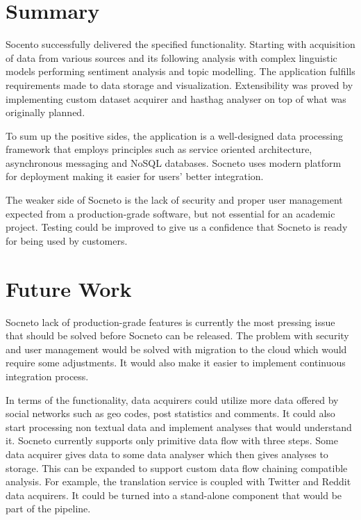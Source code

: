 \section{Summary}

Socento successfully delivered the specified functionality. Starting with acquisition of data from various sources and its following analysis with complex linguistic models performing sentiment analysis and topic modelling. The application fulfills requirements made to data storage and visualization. Extensibility was proved by implementing custom dataset acquirer and hasthag analyser on top of what was originally planned. 

To sum up the positive sides, the application is a well-designed data processing framework that  employs principles such as service oriented architecture, asynchronous messaging and NoSQL databases. Socneto uses modern platform for deployment making it easier for users' better integration. 

The weaker side of Socneto is the lack of security and proper user management expected from a production-grade software, but not essential for an academic project. Testing could be improved to give us a confidence that Socneto is ready for being used by customers.

\section{Future Work}

Socneto lack of production-grade features is currently the most pressing issue that should be solved before Socneto can be released. The problem with security and user management would be solved with migration to the cloud which would require some adjustments. It would also make it easier to implement continuous integration process.

In terms of the functionality, data acquirers could utilize more data offered by social networks such as geo codes, post statistics and comments. It could also start processing non textual data and implement analyses that would understand it. Socneto currently supports only primitive data flow with three steps. Some data acquirer gives data to some data analyser which then gives analyses to storage. This can be expanded to support custom data flow chaining compatible analysis. For example, the translation service is coupled with Twitter and Reddit data acquirers. It could be turned into a stand-alone component that would be part of the pipeline.  
